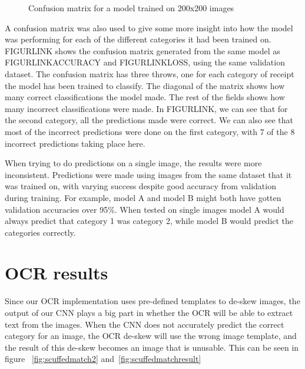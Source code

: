 \begin{figure}[h]
    \caption{Confusion matrix for a model trained on 200x200 images}
    \label{fig:200confusion}
\end{figure}

A confusion matrix was also used to give some more insight into how the model was performing for each of the different categories it had been trained on.
FIGURLINK shows the confusion matrix generated from the same model as FIGURLINKACCURACY and FIGURLINKLOSS, using the same validation dataset.
The confusion matrix has three throws, one for each category of receipt the model has been trained to classify.
The diagonal of the matrix shows how many correct classifications the model made.
The rest of the fields shows how many incorrect classifications were made.
In FIGURLINK, we can see that for the second category, all the predictions made were correct.
We can also see that most of the incorrect predictions were done on the first category, with 7 of the 8 incorrect predictions taking place here.

When trying to do predictions on a single image, the results were more inconsistent.
Predictions were made using images from the same dataset that it was trained on, with varying success despite good accuracy from validation during training.
For example, model A and model B might both have gotten validation accuracies over 95\%.
When tested on single images model A would always predict that category 1 was category 2, while model B would predict the categories correctly.

\section{OCR results}\label{sec:ocr-results}
Since our OCR implementation uses pre-defined templates to de-skew images, the output of our CNN plays a big part in whether the OCR will be able to extract text from the images.
When the CNN does not accurately predict the correct category for an image, the OCR de-skew will use the wrong image template, and the result of this de-skew becomes an image that is unusable.
This can be seen in figure ~\ref{fig:scuffedmatch2} and~\ref{fig:scuffedmatchresult}

